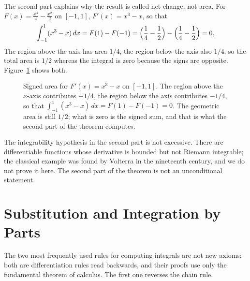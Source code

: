 The second part explains why the result is called net change, not area. For
$F(x)=\frac{x^4}{4}-\frac{x^2}{2}$ on $[-1,1]$, $F'(x)=x^3-x$, so that
\[
\int_{-1}^{1}(x^3-x)\,dx=F(1)-F(-1)=\Bigl(\frac14-\frac12\Bigr)-\Bigl(\frac14-\frac12\Bigr)=0 .
\]
The region above the axis has area $1/4$, the region below the axis also $1/4$, so the total area is
$1/2$ whereas the integral is zero because the signs are opposite.
Figure~\ref{fig:luas-bertanda} shows both.

\begin{figure}[htbp]
\centering
{}
\caption{Signed area for $F'(x)=x^3-x$ on $[-1,1]$. The region above the $x$-axis
contributes $+1/4$, the region below the axis contributes $-1/4$, so that
$\int_{-1}^{1}(x^3-x)\,dx=F(1)-F(-1)=0$. The geometric area is still $1/2$; what is zero is
the signed sum, and that is what the second part of the theorem computes.}
\label{fig:luas-bertanda}
\end{figure}

The integrability hypothesis in the second part is not excessive. There are
differentiable functions whose derivative is bounded but not Riemann integrable; the classical
example was found by Volterra in the nineteenth century, and we do not
prove it here. The second part of the theorem is not an unconditional statement.

\section{Substitution and Integration by Parts}

The two most frequently used rules for computing integrals are not new axioms: both are
differentiation rules read backwards, and their proofs use only the fundamental theorem of calculus.
The first one reverses the chain rule.

